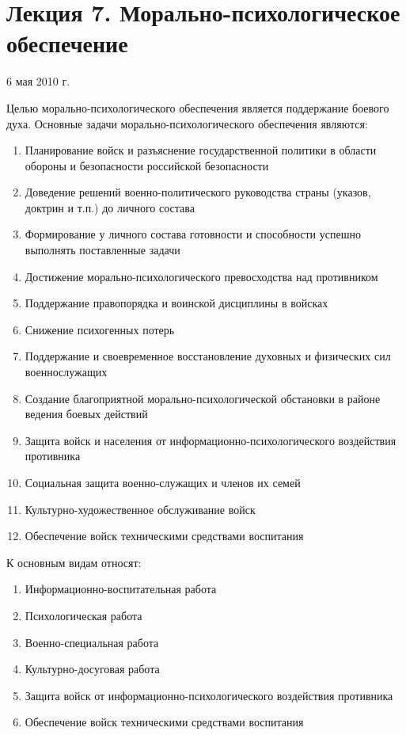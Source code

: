 \documentclass[a4paper,12pt]{article}
\begin{document}
	\section{\bf Лекция 7. Морально-психологическое обеспечение}
	\centerline{6 мая 2010 г.}
	Целью морально-психологического обеспечения является поддержание боевого духа.
	Основные задачи морально-психологического обеспечения являются:
	\begin{enumerate}
	\item Планирование войск и разъяснение государственной политики в области обороны и безопасности российской безопасности
	\item Доведение решений военно-политического руководства страны (указов, доктрин и т.п.) до личного состава
	\item Формирование у личного состава готовности и способности успешно выполнять поставленные задачи
	\item Достижение морально-психологического превосходства над противником
	\item Поддержание правопорядка и воинской дисциплины в войсках
	\item Снижение психогенных потерь
	\item Поддержание и своевременное восстановление духовных и физических сил военнослужащих
	\item Создание благоприятной морально-психологической обстановки в районе ведения боевых действий
	\item Защита войск и населения от информационно-психологического воздействия противника
	\item Социальная защита военно-служащих и членов их семей
	\item Культурно-художественное обслуживание войск
	\item Обеспечение войск техническими средствами воспитания
\end{enumerate}

	К основным видам относят:
\begin{enumerate}
	\item Информационно-воспитательная работа
	\item Психологическая работа
	\item Военно-специальная работа
	\item Культурно-досуговая работа
	\item Защита войск от информационно-психологического воздействия противника
	\item Обеспечение войск техническими средствами воспитания
\end{enumerate}
\end{document}
